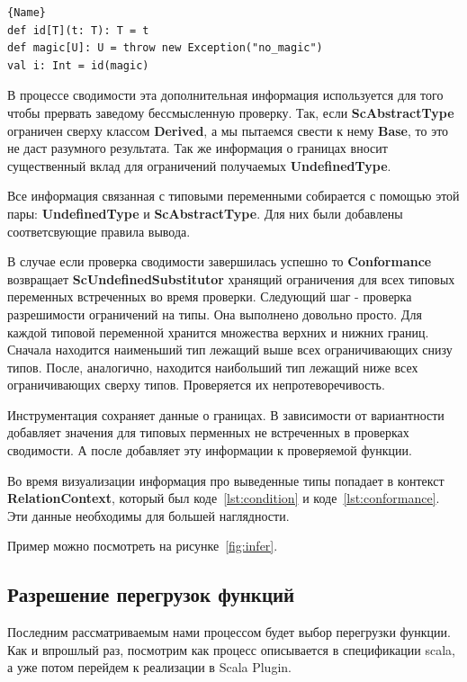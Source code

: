 \begin{lstlisting}[caption={Пример ScAbstractType},label=lst:abstract]{Name}
def id[T](t: T): T = t
def magic[U]: U = throw new Exception("no_magic")
val i: Int = id(magic)
\end{lstlisting}

В процессе сводимости эта дополнительная информация используется для
того чтобы прервать заведому бессмысленную проверку.
Так, если \textbf{ScAbstractType} ограничен сверху классом \textbf{Derived},
а мы пытаемся свести к нему \textbf{Base}, то это не даст разумного результата.
Так же информация о границах вносит существенный вклад для ограничений
получаемых \textbf{UndefinedType}.

Все информация связанная с типовыми переменными собирается с помощью этой пары:
\textbf{UndefinedType} и \textbf{ScAbstractType}.
Для них были добавлены соответсвующие правила вывода.

В случае если проверка сводимости завершилась успешно то \textbf{Conformance}
возвращает \textbf{ScUndefinedSubstitutor} хранящий ограничения для всех типовых
переменных встреченных во время проверки.
Следующий шаг - проверка разрешимости ограничений на типы.
Она выполнено довольно просто.
Для каждой типовой переменной хранится множества верхних и нижних границ.
Сначала находится наименьший тип лежащий выше всех ограничивающих снизу типов.
После, аналогично, находится наибольший тип лежащий ниже всех ограничивающих
сверху типов.
Проверяется их непротеворечивость.

Инструментация сохраняет данные о границах.
В зависимости от вариантности добавляет значения для типовых перменных не
встреченных в проверках сводимости.
А после добавляет эту информации к проверяемой функции.

Во время визуализации информация про выведенные типы попадает в контекст
\textbf{RelationContext}, который был коде~\ref{lst:condition} и
коде~\ref{lst:conformance}.
Эти данные необходимы для большей наглядности.

Пример можно посмотреть на рисунке~\ref{fig:infer}.

\subsection{Разрешение перегрузок функций}
\label{sec:overloading}

Последним рассматриваемым нами процессом будет выбор перегрузки функции.
Как и впрошлый раз, посмотрим как процесс описывается в спецификации scala,
а уже потом перейдем к реализации в Scala Plugin.

